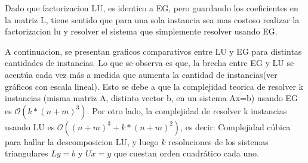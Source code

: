 Dado que factorizacion LU, es identico a EG, pero guardando los coeficientes en la matriz L, tiene sentido que para una sola instancia sea mas costoso realizar la factorizacion lu y resolver el sistema que simplemente resolver usando EG.

\vspace{0.5cm}

A continuacion, se presentan graficos comparativos entre LU y EG para distintas cantidades de instancias. Lo que se observa es que, la brecha entre EG y LU se acentúa cada vez más a medida que aumenta la cantidad de instancias(ver gráficos con escala lineal). Esto se debe a que la complejidad teorica de resolver k instancias (misma matriz A, distinto vector b, en un sistema Ax=b) usando EG es $\mathcal{O}( k * (n + m)^3 )$. Por otro lado, la complejidad de resolver k instancias usando LU es $\mathcal{O}((n + m)^3 + k*(n + m)^2)$, es decir: Complejidad cúbica para hallar la descomposicion LU, y luego $k$ resoluciones de los sistemas triangulares $Ly=b$ y $Ux=y$ que cuestan orden cuadrático cada uno. 

